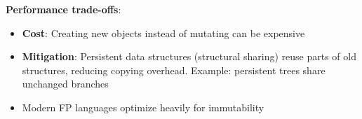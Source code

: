 \documentclass[11pt]{article}
\begin{document}
\begin{enumerate}[label=\textbf{\arabic*.}]
  \textbf{Performance trade-offs}:
  \begin{itemize}
    \item \textbf{Cost}: Creating new objects instead of mutating can be expensive
    \item \textbf{Mitigation}: Persistent data structures (structural sharing) reuse parts of old 
    structures, reducing copying overhead. Example: persistent trees share unchanged branches
    \item Modern FP languages optimize heavily for immutability
  \end{itemize}

\end{enumerate}
\end{document}
